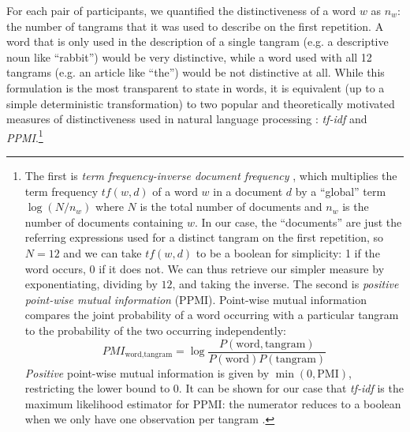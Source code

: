 \documentclass[alpha-refs]{wiley-article}
\begin{document}
For each pair of participants, we quantified the distinctiveness of a word $w$ as $n_w$: the number of tangrams that it was used to describe on the first repetition. 
A word that is only used in the description of a single tangram (e.g. a descriptive noun like ``rabbit'') would be very distinctive, while a word used with all 12 tangrams (e.g. an article like ``the'') would be not distinctive at all.
While this formulation is the most transparent to state in words, it is equivalent (up to a simple deterministic transformation) to two popular and theoretically motivated measures of distinctiveness used in natural language processing \citep{salton1988term}: \emph{tf-idf} and \emph{PPMI}.\footnote{
The first is \emph{term frequency-inverse document frequency} \citep[tf-idf,][]{sparck1972statistical}, which multiplies the term frequency $tf(w,d)$ of a word $w$ in a document $d$ by a ``global'' term $\log(N/n_w)$ where $N$ is the total number of documents and $n_w$ is the number of documents containing $w$. 
In our case, the ``documents'' are just the referring expressions used for a distinct tangram on the first repetition, so $N=12$ and we can take $tf(w,d)$ to be a boolean for simplicity: 1 if the word occurs, 0 if it does not.
We can thus retrieve our simpler measure by exponentiating, dividing by $12$, and taking the inverse.
The second is \emph{positive point-wise mutual information} (PPMI). 
Point-wise mutual information compares the joint probability of a word occurring with a particular tangram to the probability of the two occurring independently: 
$$PMI_{\textrm{word},\textrm{tangram}} = \log\frac{P(\textrm{word}, \textrm{tangram})}{P(\textrm{word})P(\textrm{tangram})}$$
\emph{Positive} point-wise mutual information is given by $\min(0, \textrm{PMI})$, restricting the lower bound to 0. 
It can be shown for our case that \emph{tf-idf} is the maximum likelihood estimator for PPMI: the numerator reduces to a boolean when we only have one observation per tangram \citep{robertson2004understanding}.}
%
\end{document}
